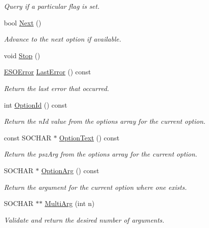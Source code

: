 \begin{DoxyCompactItemize}
\begin{DoxyCompactList}\small\item\em Query if a particular flag is set. \end{DoxyCompactList}\item 
bool \hyperlink{class_c_simple_opt_templ_ac0eef4bbcc3097ff36af89be3c0b820f}{Next} ()
\begin{DoxyCompactList}\small\item\em Advance to the next option if available. \end{DoxyCompactList}\item 
void \hyperlink{class_c_simple_opt_templ_ae76dab24d97804c34c2f91a63a8ab288}{Stop} ()
\item 
\hyperlink{_simple_opt_8h_afdf5bf76980cdbb6b1a7f639393f6669}{E\-S\-O\-Error} \hyperlink{class_c_simple_opt_templ_ab282afa789ca572e993f775b53e7a243}{Last\-Error} () const 
\begin{DoxyCompactList}\small\item\em Return the last error that occurred. \end{DoxyCompactList}\item 
int \hyperlink{class_c_simple_opt_templ_ac284454adf9589b46e40576c9adddc67}{Option\-Id} () const 
\begin{DoxyCompactList}\small\item\em Return the n\-Id value from the options array for the current option. \end{DoxyCompactList}\item 
const S\-O\-C\-H\-A\-R $\ast$ \hyperlink{class_c_simple_opt_templ_a73a15c4c89443c4f74f016fc338b3f0b}{Option\-Text} () const 
\begin{DoxyCompactList}\small\item\em Return the psz\-Arg from the options array for the current option. \end{DoxyCompactList}\item 
S\-O\-C\-H\-A\-R $\ast$ \hyperlink{class_c_simple_opt_templ_a455eadc6db4b85d1a22e1bdd48f5829b}{Option\-Arg} () const 
\begin{DoxyCompactList}\small\item\em Return the argument for the current option where one exists. \end{DoxyCompactList}\item 
S\-O\-C\-H\-A\-R $\ast$$\ast$ \hyperlink{class_c_simple_opt_templ_ad0ec3543a8272202a107ddbfee19a09d}{Multi\-Arg} (int n)
\begin{DoxyCompactList}\small\item\em Validate and return the desired number of arguments. \end{DoxyCompactList}\item 
$$
\end{DoxyCompactItemize}
